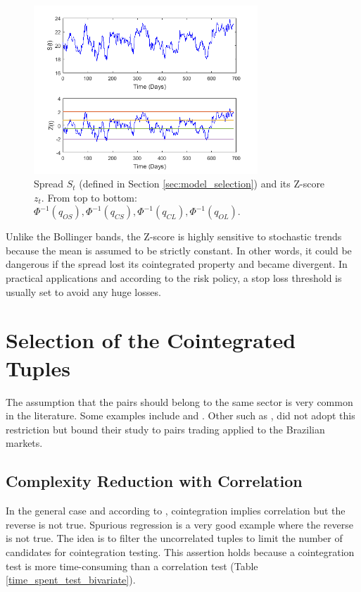 \documentclass[11pt,a4,twosided,singlespacing,titlepagenumber=on]{scrreprt}
\numberwithin{equation}{chapter} %
\theoremstyle{remark}
\begin{document}
\begin{figure}[H]
\centering
\includegraphics[width = 0.75\textwidth]{zscore/zscore1}
\caption{Spread $S_t$ (defined in Section \ref{sec:model_selection}) and its Z-score $z_t$. From top to bottom: $\Phi^{-1}(q_{OS}), \Phi^{-1}(q_{CS}), \Phi^{-1}(q_{CL}), \Phi^{-1}(q_{OL})$.}
\label{zscore_graphical_strat}
\end{figure}

Unlike the Bollinger bands, the Z-score is highly sensitive to stochastic trends because the mean is assumed to be strictly constant. In other words, it could be dangerous if the spread lost its cointegrated property and became divergent. In practical applications and according to the risk policy, a stop loss threshold is usually set to avoid any huge losses.

\section{Selection of the Cointegrated Tuples}
The assumption that the pairs should belong to the same sector is very common in the literature. Some examples include \cite{chan2009} and \cite{dunis2010}. Other such as \cite{caldeira2013}, did not adopt this restriction but bound their study to pairs trading applied to the Brazilian markets. 

\subsection{Complexity Reduction with Correlation}
\label{Complexity_Reduction_with_Correlation}
In the general case and according to \cite{vidyamurthy2004}, cointegration implies correlation but the reverse is not true. Spurious regression is a very good example where the reverse is not true. The idea is to filter the uncorrelated tuples to limit the number of candidates for cointegration testing. This assertion holds because a cointegration test is more time-consuming than a correlation test (Table \ref{time_spent_test_bivariate}).
\end{document}
